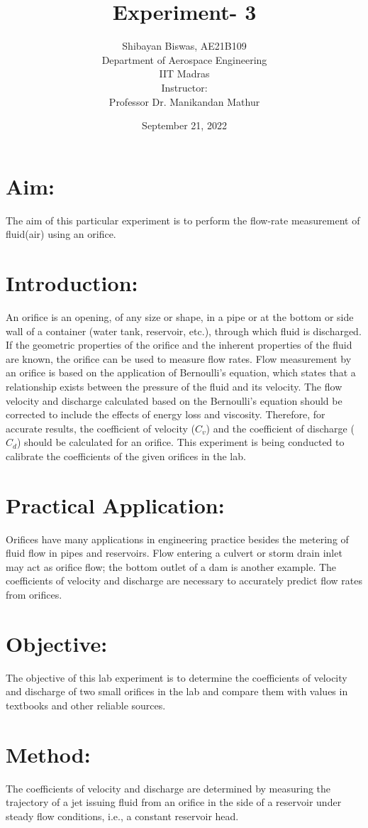 \documentclass[12pt,a4paper]{article}
\author{ Shibayan Biswas, AE21B109\\ Department of Aerospace Engineering\\ IIT Madras\\[3ex] Instructor:\\ \large Professor Dr. Manikandan Mathur}
\title{Experiment- 3}
\date{September 21, 2022}
\begin{document}
\maketitle
\hline
\section{Aim:}
The aim of this particular experiment is to perform the flow-rate measurement of fluid(air) using an orifice.
\section{Introduction:}
An orifice is an opening, of any size or shape, in a pipe or at the bottom or side wall of a container (water tank, reservoir, etc.), through which fluid is discharged. If the geometric properties of the orifice and the inherent properties of the fluid are known, the orifice can be used to measure flow rates. Flow measurement by an orifice is based on the application of Bernoulli’s equation, which states that a relationship exists between the pressure of the fluid and its velocity. The flow velocity and discharge calculated based on the Bernoulli’s equation should be corrected to include the effects of energy loss and viscosity. Therefore, for accurate results, the coefficient of velocity ($C_v$) and the coefficient of discharge ($C_d$) should be calculated for an orifice. This experiment is being conducted to calibrate the coefficients of the given orifices in the lab.
\section{Practical Application:}
Orifices have many applications in engineering practice besides the metering of fluid flow in pipes and reservoirs. Flow entering a culvert or storm drain inlet may act as orifice flow; the bottom outlet of a dam is another example. The coefficients of velocity and discharge are necessary to accurately predict flow rates from orifices.
\section{Objective:}
The objective of this lab experiment is to determine the coefficients of velocity and discharge of two small orifices in the lab and compare them with values in textbooks and other reliable sources.
\section{Method:}
The coefficients of velocity and discharge are determined by measuring the trajectory of a jet issuing fluid from an orifice in the side of a reservoir under steady flow conditions, i.e., a constant reservoir head.
\end{document}

